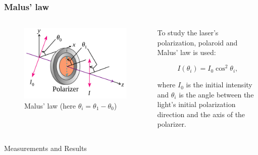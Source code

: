 \documentclass{beamer}
\begin{document}
	\begin{frame}
		\frametitle{Malus' law}
		\begin{columns}
		\begin{column}{0.4\textwidth}
			\begin{figure}
				\centering
				\includegraphics[width=1\linewidth]{res/malus_law.png}
				\caption{Malus' law (here $\theta_i = \theta_1 - \theta_0$)}
			\end{figure}
		\end{column}
		\begin{column}{0.6\textwidth}
			 To study the laser's polarization, polaroid and Malus' law is used:
			 
			 $$I(\theta_i) = I_0 \cos^2{\theta_i},$$
			 
			 where $I_0$ is the initial intensity and $\theta_i$ is the angle between the light's initial polarization direction and the axis of the polarizer.
			 
		\end{column}
		\end{columns}	
	\end{frame}


	\begin{frame}[plain,c]
		
		\begin{center}
			\huge {} Measurements and Results
		\end{center}
		
	\end{frame}
	
\end{document}
